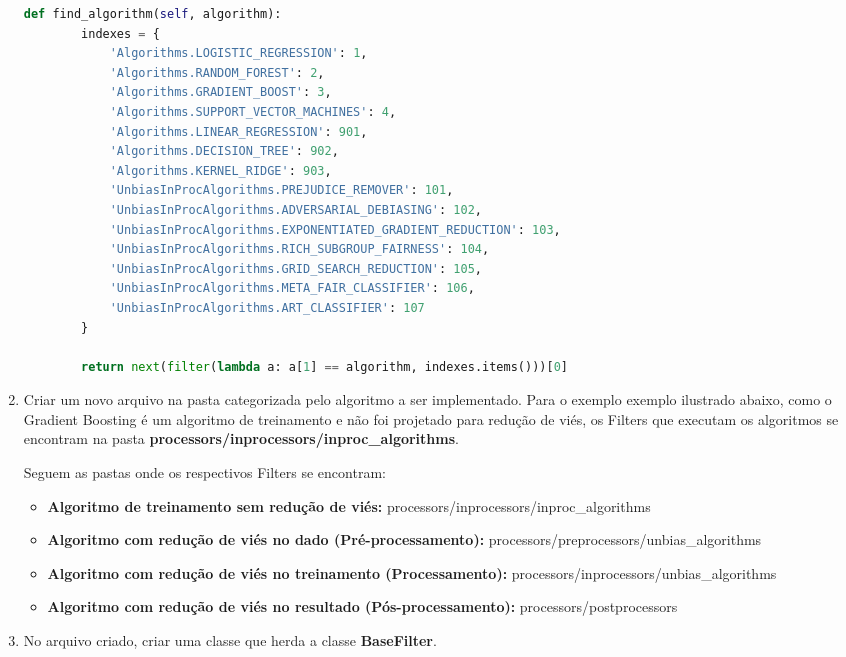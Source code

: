 \documentclass[portugues]{ic-tese}
\begin{document}
\begin{enumerate}
\begin{lstlisting}[language=Python, label=cod:FindAlgorithm]
    def find_algorithm(self, algorithm):
        indexes = {
            'Algorithms.LOGISTIC_REGRESSION': 1,
            'Algorithms.RANDOM_FOREST': 2,
            'Algorithms.GRADIENT_BOOST': 3,
            'Algorithms.SUPPORT_VECTOR_MACHINES': 4,
            'Algorithms.LINEAR_REGRESSION': 901,
            'Algorithms.DECISION_TREE': 902,
            'Algorithms.KERNEL_RIDGE': 903,
            'UnbiasInProcAlgorithms.PREJUDICE_REMOVER': 101,
            'UnbiasInProcAlgorithms.ADVERSARIAL_DEBIASING': 102,
            'UnbiasInProcAlgorithms.EXPONENTIATED_GRADIENT_REDUCTION': 103,
            'UnbiasInProcAlgorithms.RICH_SUBGROUP_FAIRNESS': 104,
            'UnbiasInProcAlgorithms.GRID_SEARCH_REDUCTION': 105,
            'UnbiasInProcAlgorithms.META_FAIR_CLASSIFIER': 106,
            'UnbiasInProcAlgorithms.ART_CLASSIFIER': 107
        }

        return next(filter(lambda a: a[1] == algorithm, indexes.items()))[0]
\end{lstlisting}

\item Criar um novo arquivo na pasta categorizada pelo algoritmo a ser implementado. Para o exemplo exemplo ilustrado abaixo, como o Gradient Boosting é um algoritmo de treinamento e não foi projetado para redução de viés, os Filters que executam os algoritmos se encontram na pasta \textbf{processors/inprocessors/inproc\_algorithms}.

Seguem as pastas onde os respectivos Filters se encontram:

\begin{itemize}
\item \textbf{Algoritmo de treinamento sem redução de viés:} processors/inprocessors/inproc\_algorithms
\item \textbf{Algoritmo com redução de viés no dado (Pré-processamento):} processors/preprocessors/unbias\_algorithms
\item \textbf{Algoritmo com redução de viés no treinamento (Processamento):} processors/inprocessors/unbias\_algorithms
\item \textbf{Algoritmo com redução de viés no resultado (Pós-processamento):} processors/postprocessors
\end{itemize}

\item No arquivo criado, criar uma classe que herda a classe \textbf{BaseFilter}.


\end{enumerate}
\end{document}
